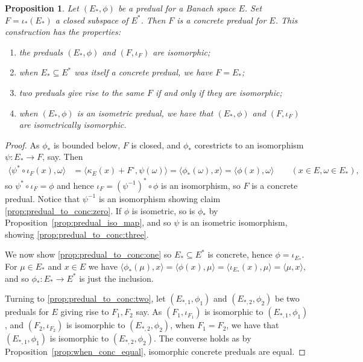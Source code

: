 \documentclass[a4paper,11pt]{article}
\theoremstyle{plain}
\newtheorem{proposition}{Proposition}[section]
\theoremstyle{remark}
\newcommand{\ip}[2]{{\langle {#1} , {#2} \rangle}}
\begin{document}
\begin{proposition}\label{prop:predual_to_conc}
Let $(E_*, \phi)$ be a predual for a Banach space $E$.  Set $F = \iota_*(E_*)$ a closed subspace of $E^*$.  Then $F$ is a concrete predual for $E$.  This construction has the properties:
\begin{enumerate}[(1)]
  \item\label{prop:predual_to_conc:zero} 
  the preduals $(E_*, \phi)$ and $(F,\iota_F)$ are isomorphic;
  \item\label{prop:predual_to_conc:one} 
  when $E_* \subseteq E^*$ was itself a concrete predual, we have $F = E_*$;
  \item\label{prop:predual_to_conc:two}
  two preduals give rise to the same $F$ if and only if they are isomorphic;
  \item\label{prop:predual_to_conc:three}
  when $(E_*,\phi)$ is an isometric predual, we have that $(E_*, \phi)$ and $(F,\iota_F)$ are isometrically isomorphic.
\end{enumerate}
\end{proposition}
\begin{proof}
As $\phi_*$ is bounded below, $F$ is closed, and $\phi_*$ corestricts to an isomorphism $\psi \colon E_* \to F$, say.  Then
\begin{align*}
\ip{\psi^* \circ \iota_F(x)}{\omega}
&= \ip{\kappa_E(x)+F^\circ}{\psi(\omega)}
= \ip{\phi_*(\omega)}{x}
= \ip{\phi(x)}{\omega} \qquad (x\in E, \omega\in E_*),
\end{align*}
so $\psi^* \circ \iota_F = \phi$ and hence $\iota_F = (\psi^{-1})^* \circ \phi$ is an isomorphism, so $F$ is a concrete predual.  Notice that $\psi^{-1}$ is an isomorphism showing claim \ref{prop:predual_to_conc:zero}.  If $\phi$ is isometric, so is $\phi_*$ by Proposition~\ref{prop:predual_iso_map}, and so $\psi$ is an isometric isomorphism, showing \ref{prop:predual_to_conc:three}.

We now show \ref{prop:predual_to_conc:one} so $E_* \subseteq E^*$ is concrete, hence $\phi = \iota_{E_*}$.  For $\mu\in E_*$ and $x\in E$ we have $\ip{\phi_*(\mu)}{x} = \ip{\phi(x)}{\mu} = \ip{\iota_{E_*}(x)}{\mu} = \ip{\mu}{x}$, and so $\phi_* \colon E_* \to E^*$ is just the inclusion.

Turning to \ref{prop:predual_to_conc:two}, let $(E_{*,1}, \phi_1)$ and $(E_{*,2}, \phi_2)$ be two preduals for $E$ giving rise to $F_1, F_2$ say.  %
As $(F_1, \iota_{F_1})$ is isomorphic to $(E_{*,1}, \phi_1)$, and $(F_2, \iota_{F_2})$ is isomorphic to $(E_{*,2}, \phi_2)$, when $F_1 = F_2$, we have that $(E_{*,1}, \phi_1)$ is isomorphic to $(E_{*,2}, \phi_2)$.  %
The converse holds as by Proposition~\ref{prop:when_conc_equal}, isomorphic concrete preduals are equal.
\end{proof}
\end{document}
